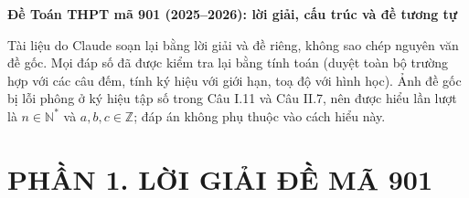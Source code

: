 \documentclass[11pt,a4paper]{article}
\begin{document}
{\LARGE\bfseries\color{hd} Đề Toán THPT mã 901 (2025--2026): lời giải, cấu trúc và đề tương tự\par}
\vspace{4pt}
{\small\color{black!70} Tài liệu do Claude soạn lại bằng lời giải và đề riêng, không sao chép nguyên văn đề gốc. Mọi đáp số đã được kiểm tra lại bằng tính toán (duyệt toàn bộ trường hợp với các câu đếm, tính ký hiệu với giới hạn, toạ độ với hình học). Ảnh đề gốc bị lỗi phông ở ký hiệu tập số trong Câu I.11 và Câu II.7, nên được hiểu lần lượt là $n\in\mathbb N^*$ và $a,b,c\in\mathbb Z$; đáp án không phụ thuộc vào cách hiểu này.\par}

\section{PHẦN 1. LỜI GIẢI ĐỀ MÃ 901}
\end{document}
